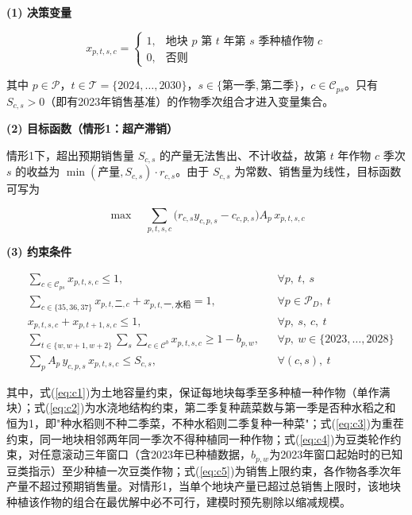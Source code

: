 \textbf{(1) 决策变量}

\begin{equation}
x_{p,t,s,c} = \begin{cases} 1, & \text{地块 } p \text{ 第 } t \text{ 年第 } s \text{ 季种植作物 } c\\ 0, & \text{否则} \end{cases}
\end{equation}

其中 $p\in\mathcal{P}$，$t\in\mathcal{T}=\{2024,\ldots,2030\}$，$s\in\{\text{第一季},\text{第二季}\}$，$c\in\mathcal{C}_{ps}$。只有 $S_{c,s}>0$（即有2023年销售基准）的作物季次组合才进入变量集合。

\textbf{(2) 目标函数（情形1：超产滞销）}

情形1下，超出预期销售量 $S_{c,s}$ 的产量无法售出、不计收益，故第 $t$ 年作物 $c$ 季次 $s$ 的收益为 $\min(\text{产量},S_{c,s})\cdot r_{c,s}$。由于 $S_{c,s}$ 为常数、销售量为线性，目标函数可写为

\begin{equation}
\max\quad \sum_{p,t,s,c}\big( r_{c,s} y_{c,p,s} - c_{c,p,s} \big) A_p\, x_{p,t,s,c}
\label{eq:obj1}
\end{equation}

\textbf{(3) 约束条件}

\begin{align}
& \sum_{c\in\mathcal{C}_{ps}} x_{p,t,s,c} \le 1, && \forall p,\ t,\ s \label{eq:c1}\\
& \sum_{c\in\{35,36,37\}} x_{p,t,\text{二},c} + x_{p,t,\text{一},\text{水稻}} = 1, && \forall p\in\mathcal{P}_D,\ t \label{eq:c2}\\
& x_{p,t,s,c} + x_{p,t+1,s,c} \le 1, && \forall p,\ s,\ c,\ t \label{eq:c3}\\
& \sum_{t\in\{w,w+1,w+2\}}\sum_{s}\sum_{c\in\mathcal{C}^b} x_{p,t,s,c} \ge 1 - b_{p,w}, && \forall p,\ w\in\{2023,\ldots,2028\} \label{eq:c4}\\
& \sum_{p} A_p\, y_{c,p,s}\, x_{p,t,s,c} \le S_{c,s}, && \forall (c,s),\ t \label{eq:c5}
\end{align}

其中，式(\ref{eq:c1})为土地容量约束，保证每地块每季至多种植一种作物（单作满块）；式(\ref{eq:c2})为水浇地结构约束，第二季复种蔬菜数与第一季是否种水稻之和恒为1，即"种水稻则不种二季菜，不种水稻则二季复种一种菜"；式(\ref{eq:c3})为重茬约束，同一地块相邻两年同一季次不得种植同一种作物；式(\ref{eq:c4})为豆类轮作约束，对任意滚动三年窗口（含2023年已种植数据，$b_{p,w}$为2023年窗口起始时的已知豆类指示）至少种植一次豆类作物；式(\ref{eq:c5})为销售上限约束，各作物各季次年产量不超过预期销售量。对情形1，当单个地块产量已超过总销售上限时，该地块种植该作物的组合在最优解中必不可行，建模时预先剔除以缩减规模。

